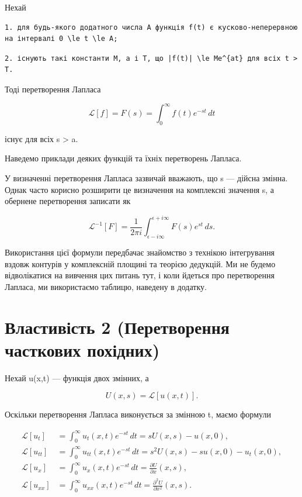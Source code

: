 \documentclass[
  ukrainian,
]{article}
\begin{document}
Нехай

\begin{verbatim}
1. для будь-якого додатного числа A функція f(t) є кусково-неперервною на інтервалі 0 \le t \le A;
\end{verbatim}

\begin{verbatim}
2. існують такі константи M, a і T, що |f(t)| \le Me^{at} для всіх t > T.
\end{verbatim}

Тоді перетворення Лапласа

\[
\mathscr{L}[f] = F(s) = \int_0^\infty f(t)e^{-st}\,dt
\]

існує для всіх s \textgreater{} a.

Наведемо приклади деяких функцій та їхніх перетворень Лапласа.

У визначенні перетворення Лапласа зазвичай вважають, що s --- дійсна
змінна. Однак часто корисно розширити це визначення на комплексні
значення s, а обернене перетворення записати як

\[
\mathscr{L}^{-1}[F] = \frac{1}{2\pi i} \int_{\epsilon - i\infty}^{\epsilon + i\infty} F(s)e^{st}\,ds.
\]

Використання цієї формули передбачає знайомство з технікою інтегрування
вздовж контурів у комплексній площині та теорією дедукцій. Ми не будемо
відволікатися на вивчення цих питань тут, і коли йдеться про
перетворення Лапласа, ми використаємо таблицю, наведену в додатку.

\section{Властивість 2 (Перетворення часткових
похідних)}\label{ux432ux43bux430ux441ux442ux438ux432ux456ux441ux442ux44c-2-ux43fux435ux440ux435ux442ux432ux43eux440ux435ux43dux43dux44f-ux447ux430ux441ux442ux43aux43eux432ux438ux445-ux43fux43eux445ux456ux434ux43dux438ux445}

Нехай u(x,t) --- функція двох змінних, а

\[
U(x,s)=\mathcal{L}\!\left[u(x,t)\right].
\]

Оскільки перетворення Лапласа виконується за змінною t, маємо формули

\[
\begin{aligned}
\mathcal{L}\!\left[u_t\right]
&=\int_0^\infty u_t(x,t)e^{-st}\,dt
=sU(x,s)-u(x,0),\\
\mathcal{L}\!\left[u_{tt}\right]
&=\int_0^\infty u_{tt}(x,t)e^{-st}\,dt
=s^2U(x,s)-su(x,0)-u_t(x,0),\\
\mathcal{L}\!\left[u_x\right]
&=\int_0^\infty u_x(x,t)e^{-st}\,dt
=\frac{\partial U}{\partial x}(x,s),\\
\mathcal{L}\!\left[u_{xx}\right]
&=\int_0^\infty u_{xx}(x,t)e^{-st}\,dt
=\frac{\partial^2 U}{\partial x^2}(x,s).
\end{aligned}
\]
\end{document}

